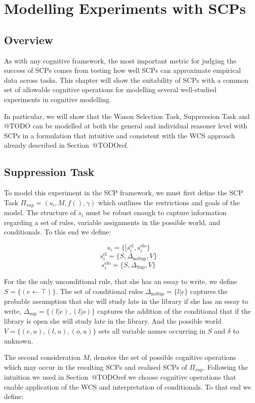 \chapter{Modelling Experiments with SCPs} \label{chp:model}
\section{Overview}
As with any cognitive framework, the most important metric for judging the success of SCPs comes from testing how well SCPs can approximate empirical data across tasks. This chapter will show the suitability of SCPs with a common set of allowable cognitive operations for modelling several well-studied experiments in cognitive modelling.

In particular, we will show that the Wason Selection Task, Suppression Task and @TODO can be modelled at both the general and individual reasoner level with SCPs in a formulation that intuitive and consistent with the WCS approach already described in Section~@TODOref.
\section{Suppression Task} \label{sec:supSCP}



To model this experiment in the SCP framework, we must first define the SCP Task $\Pi_{sup}=(s_i,M,f(),\gamma)$ which outlines the restrictions and goals of the model. The structure of $s_i$ must be robust enough to capture information regarding a set of rules, variable assignments in the possible world, and conditionals. To this end we define:

\[s_i=\{[s_i^\text{el},s_i^\text{elo}\}\]
\[s_i^\text{el}=\{S,\Delta_\text{noSup}, V\} \]
\[s_i^\text{elo}=\{S,\Delta_\text{Sup}, V\} \]




For the the only unconditional rule, that she has an essay to write, we define $S=\{(e \leftarrow \top)\}$. The set of conditional rules $\Delta_{\text{noSup}}=\{l|e\}$ captures the probable assumption that she will study late in the library if she has an essay to write, $\Delta_{\text{sup}}=\{(l|e),(l|o)\}$ captures the addition of the conditional that if the library is open she will study late in the library. And the possible world $V=\{(e,u),(l,u),(o,u)\}$ sets all variable names occurring in $S$ and $\delta$ to unknown.

The second consideration $M$, denotes the set of possible cognitive operations which may occur in the resulting SCPs and realised SCPs of $\Pi_{sup}$. Following the intuition we used in Section~@TODOref we choose cognitive operations that enable application of the WCS and interpretation of conditionals. To that end we define:

